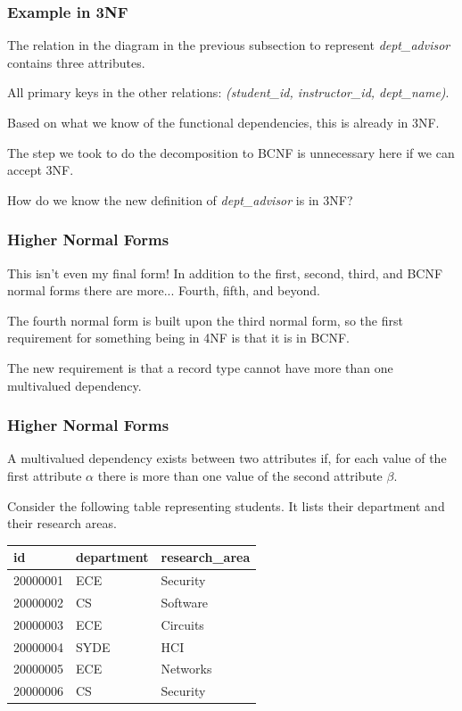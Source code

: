 \begin{frame}
\frametitle{Example in 3NF}

The relation in the diagram in the previous subsection to represent \textit{dept\_advisor} contains three attributes. 

All primary keys in the other relations: \textit{(student\_id, instructor\_id, dept\_name)}. 

Based on what we know of the functional dependencies, this is already in 3NF. 

The step we took to do the decomposition to BCNF is unnecessary here if we can accept 3NF.

How do we know the new definition of \textit{dept\_advisor} is in 3NF?

\end{frame}



\begin{frame}
\frametitle{Higher Normal Forms}

This isn't even my final form! In addition to the first, second, third, and BCNF normal forms there are more... Fourth, fifth, and beyond.  

The fourth normal form is built upon the third normal form, so the first requirement for something being in 4NF is that it is in BCNF. 

The new requirement is that a record type cannot have more than one multivalued dependency.

\end{frame}



\begin{frame}
\frametitle{Higher Normal Forms}

A multivalued dependency exists between two attributes if, for each value of the first attribute $\alpha$ there is more than one value of the second attribute $\beta$.

Consider the following table representing students. It lists their department and their research areas. 

\begin{center}
\begin{tabular}{|l|l|l|} \hline
	\textbf{id} & \textbf{department} & \textbf{research\_area} \\ \hline
	20000001 & ECE & Security \\ \hline
	20000002 & CS & Software \\ \hline
    20000003 & ECE & Circuits \\ \hline
    20000004 & SYDE & HCI \\ \hline
    20000005 & ECE & Networks \\ \hline
    20000006 & CS & Security \\ \hline
\end{tabular}
\end{center}

\end{frame}



